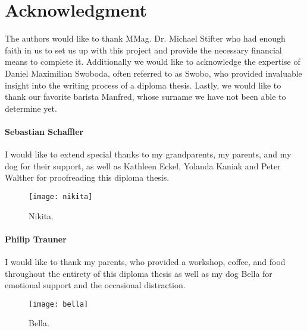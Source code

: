 \chapter*{Acknowledgment}

The authors would like to thank MMag. Dr. Michael Stifter who had enough faith in us to set us up with this project and provide the necessary financial means to complete it. Additionally we would like to acknowledge the expertise of Daniel Maximilian Swoboda, often referred to as Swobo, who provided invaluable insight into the writing process of a diploma thesis. Lastly, we would like to thank our favorite barista Manfred, whose surname we have not been able to determine yet. \\

\subsubsection{Sebastian Schaffler}
I would like to extend special thanks to my grandparents, my parents, and my dog for their support, as well as Kathleen Eckel, Yolanda Kaniak and Peter Walther for proofreading this diploma thesis.

\begin{figure}[H]
\centering

\texttt{[image: nikita]}

\caption{Nikita.}
\end{figure}

\subsubsection{Philip Trauner}
I would like to thank my parents, who provided a workshop, coffee, and food throughout the entirety of this diploma thesis as well as my dog Bella for emotional support and the occasional distraction.

\begin{figure}[H]
\centering

\texttt{[image: bella]}

\caption{Bella.}
\end{figure}



